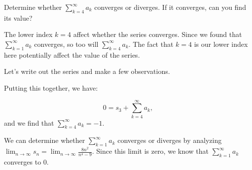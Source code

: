 \documentclass{ximera}
\begin{document}
\begin{example}
\begin{question}
Determine whether $\sum_{k=4}^{\infty} a_k$ converges or diverges.  If it converges, can you find its value?

\begin{explanation}
The lower index $k=4$   affect whether the series converges.  Since we found that $\sum_{k=1}^{\infty} a_k$ converges, so too will $\sum_{k=4}^{\infty} a_k$.  The fact that $k=4$ is our lower index here  potentially affect the value of the series.

Let's write out the series and make a few observations.

\begin{image}
  \end{image}
  
 Putting this together, we have:
 
 \[
 0 = s_3 + \sum_{k=4}^{\infty} a_k,
 \] 
 and we find that $ \sum_{k=4}^{\infty} a_k = -1$. 

We can determine whether $\sum_{k=1}^{\infty} a_k$ converges or diverges by analyzing $\lim_{n \to \infty} s_n = \lim_{n \to \infty} \frac{8n^2}{n^4-9}$.  Since this limit is zero, we know that $\sum_{k=1}^{\infty} a_k$ converges to $0$.
\end{explanation}
\end{question}

\end{example}
\end{document}
